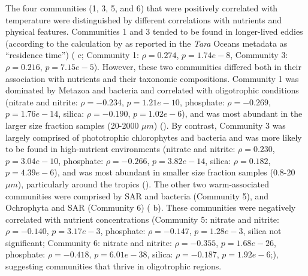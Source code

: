 \documentclass[12pt]{article}
\numberwithin{equation}{section}
\begin{document}
The four communities (1, 3, 5, and 6) that were positively correlated with temperature were distinguished by different correlations with nutrients and physical features. Communities 1 and 3 tended to be found in longer-lived eddies (according to the calculation by \cite{d2010fluid} as reported in the \textit{Tara} Oceans metadata \cite{taraoceansconsortium2016ecoa} as ``residence time'') ( c; Community 1: $\rho=0.274$, $p=1.74e-8$, Community 3: $\rho=0.216$, $p=7.15e-5$). However, these two communities differed both in their association with nutrients and their taxonomic compositions. Community 1 was dominated by Metazoa and bacteria and correlated with oligotrophic conditions (nitrate and nitrite: $\rho=-0.234$, $p=1.21e-10$, phosphate: $\rho=-0.269$, $p=1.76e-14$, silica: $\rho=-0.190$, $p=1.02e-6$),  and was most abundant in the larger size fraction samples (20-2000 $\mu m$) (). By contrast, Community 3 was largely comprised of phototrophic chlorophytes and bacteria and was more likely to be found in high-nutrient environments (nitrate and nitrite: $\rho=0.230$, $p=3.04e-10$, phosphate: $\rho=-0.266$, $p=3.82e-14$, silica: $\rho=0.182$, $p=4.39e-6$), and was most abundant in smaller size fraction samples (0.8-20 $\mu m$), particularly around the tropics (). The other two warm-associated communities were comprised by SAR and bacteria (Community 5), and Ochrophyta and SAR (Community 6) ( b). These communities were negatively correlated with nutrient concentrations (Community 5: nitrate and nitrite: $\rho=-0.140$, $p=3.17e-3$, phosphate: $\rho=-0.147$, $p=1.28e-3$, silica not significant; Community 6: nitrate and nitrite: $\rho=-0.355$, $p=1.68e-26$, phosphate: $\rho=-0.418$, $p=6.01e-38$, silica: $\rho=-0.187$, $p=1.92e-6$;), suggesting communities that thrive in oligotrophic regions.
\end{document}
